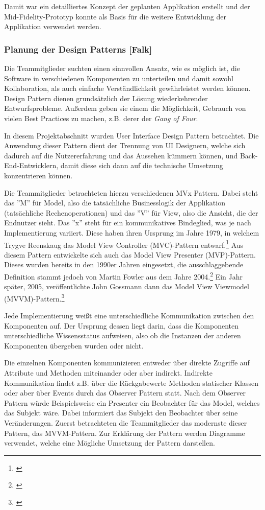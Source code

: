 Damit war ein detailliertes Konzept der geplanten Applikation erstellt und der Mid-Fidelity-Prototyp konnte als Basis für die weitere Entwicklung der Applikation verwendet werden. 

\clearpage

\subsubsection{Planung der Design Patterns [Falk]}

Die Teammitglieder suchten einen sinnvollen Ansatz, wie es möglich ist, die Software in verschiedenen Komponenten zu unterteilen und damit sowohl Kollaboration, als auch einfache Verständlichkeit gewährleistet werden können. Design Pattern dienen grundsätzlich der Lösung wiederkehrender Entwurfsprobleme. Außerdem geben sie einem die Möglichkeit, Gebrauch von vielen Best Practices zu machen, z.B. derer der \textit{Gang of Four}. 

In diesem Projektabschnitt wurden User Interface Design Pattern betrachtet. Die Anwendung dieser Pattern dient der Trennung von UI Designern, welche sich dadurch auf die Nutzererfahrung und das Aussehen kümmern können, und Back-End-Entwicklern, damit diese sich dann auf die technische Umsetzung konzentrieren können. 

Die Teammitglieder betrachteten hierzu verschiedenen MVx Pattern. Dabei steht das ''M'' für Model, also die tatsächliche Businesslogik der Applikation (tatsächliche Rechenoperationen) und das ''V'' für View, also die Ansicht, die der Endnutzer sieht. Das ''x'' steht für ein kommunikatives Bindeglied, was je nach Implementierung variiert. Diese haben ihren Ursprung im Jahre 1979, in welchem Trygve Reenskaug das Model View Controller (MVC)-Pattern entwarf.\footnote{\cite[vgl.][]{c2MVC}} Aus diesem Pattern entwickelte sich auch das Model View Presenter (MVP)-Pattern. Dieses wurden bereits in den 1990er Jahren eingesetzt, die ausschlaggebende Definition stammt jedoch von Martin Fowler aus dem Jahre 2004.\footnote{\cite[vgl.][]{FowlerMVP}} Ein Jahr später, 2005, veröffentlichte John Gossmann dann das Model View Viewmodel (MVVM)-Pattern.\footnote{\cite[vgl.][]{HeiseMVVM}}

Jede Implementierung weißt eine unterschiedliche Kommunikation zwischen den Komponenten auf. Der Ursprung dessen liegt darin, dass die Komponenten unterschiedliche Wissensstatus aufweisen, also ob die Instanzen der anderen Komponenten übergeben wurden oder nicht. 

Die einzelnen Komponenten kommunizieren entweder über direkte Zugriffe auf Attribute und Methoden miteinander oder aber indirekt. Indirekte Kommunikation findet z.B. über die Rückgabewerte Methoden statischer Klassen oder aber über Events durch das Observer Pattern statt. Nach dem Observer Pattern würde Beispielsweise ein Presenter ein Beobachter für das Model, welches das Subjekt wäre. Dabei informiert das Subjekt den Beobachter über seine Veränderungen. 
Zuerst betrachteten die Teammitglieder das modernste dieser Pattern, das MVVM-Pattern. Zur Erklärung der Pattern werden Diagramme verwendet, welche eine Mögliche Umsetzung der Pattern darstellen.

